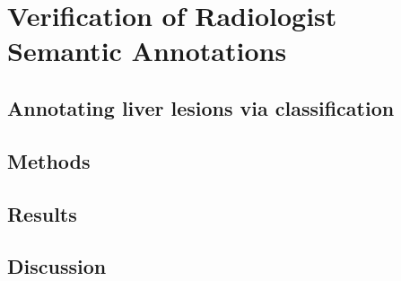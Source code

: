 \chapter{Verification of Radiologist Semantic Annotations}

\clearpage

\section{Annotating liver lesions via classification}

\clearpage

\section{Methods}

\clearpage

\section{Results}

\clearpage

\section{Discussion}

\clearpage